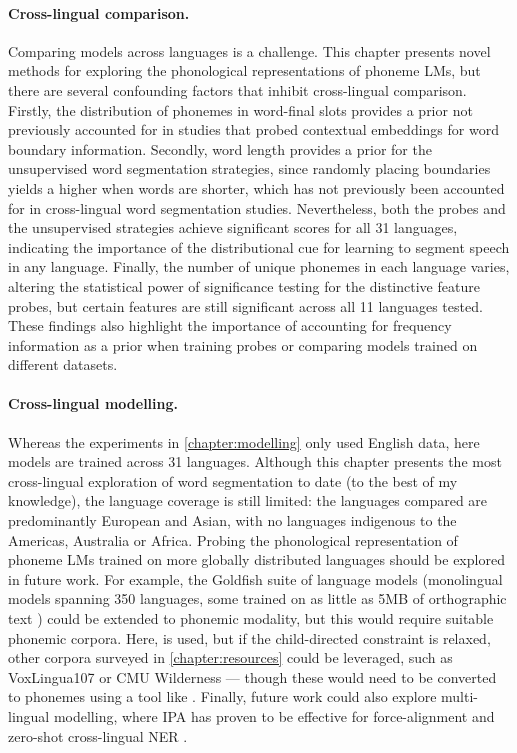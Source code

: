 \paragraph{Cross-lingual comparison.} Comparing models across languages is a challenge. This chapter presents novel methods for exploring the phonological representations of phoneme LMs, but there are several confounding factors that inhibit cross-lingual comparison. Firstly, the distribution of phonemes in word-final slots provides a prior not previously accounted for in studies that probed contextual embeddings for word boundary information. Secondly, word length provides a prior for the unsupervised word segmentation strategies, since randomly placing boundaries yields a higher \fscore when words are shorter, which has not previously been accounted for in cross-lingual word segmentation studies. Nevertheless, both the probes and the unsupervised strategies achieve significant scores for all 31 languages, indicating the importance of the distributional cue for learning to segment speech in any language. Finally, the number of unique phonemes in each language varies, altering the statistical power of significance testing for the distinctive feature probes, but certain features are still significant across all 11 languages tested. These findings also highlight the importance of accounting for frequency information as a prior when training probes or comparing models trained on different datasets.

\paragraph{Cross-lingual modelling.} Whereas the experiments in \cref{chapter:modelling} only used English data, here models are trained across 31 languages. Although this chapter presents the most cross-lingual exploration of word segmentation to date (to the best of my knowledge), the language coverage is still limited: the languages compared are predominantly European and Asian, with no languages indigenous to the Americas, Australia or Africa. Probing the phonological representation of phoneme LMs trained on more globally distributed languages should be explored in future work. For example, the Goldfish suite of language models (monolingual models spanning 350 languages, some trained on as little as 5MB of orthographic text \citep{chang2024goldfish}) could be extended to phonemic modality, but this would require suitable phonemic corpora. Here, \ipachildes is used, but if the child-directed constraint is relaxed, other corpora surveyed in \cref{chapter:resources} could be leveraged, such as VoxLingua107 \citep{9383459} or CMU Wilderness \citep{8683536} --- though these would need to be converted to phonemes using a tool like \gpp. Finally, future work could also explore multi-lingual modelling, where IPA has proven to be effective for force-alignment \citep{zhu-etal-2024-taste} and zero-shot cross-lingual NER \citep{sohn2024zero}.

